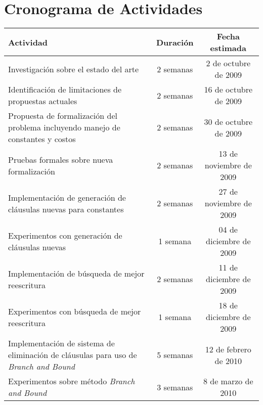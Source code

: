 \section{Cronograma de Actividades}

\begin{tabular}{|p{8cm}|c|c|}
\hline
Actividad & Duración & Fecha estimada \\
\hline
\hline
Investigación sobre el estado del arte & 2 semanas & 2 de octubre de 2009\\
\hline
Identificación de limitaciones de propuestas actuales & 2 semanas & 16 de octubre de 2009\\
\hline
Propuesta de formalización del problema incluyendo manejo de constantes y costos & 2 semanas & 30 de octubre de 2009 \\
\hline
Pruebas formales sobre nueva formalización & 2 semanas &  13 de noviembre de 2009 \\
\hline
Implementación de generación de cláusulas nuevas para constantes & 2 semanas & 27 de noviembre de 2009 \\
\hline
Experimentos con generación de cláusulas nuevas & 1 semana & 04 de diciembre de 2009 \\
\hline
Implementación de búsqueda de mejor reescritura & 2 semanas & 11 de diciembre de 2009 \\
\hline
Experimentos con búsqueda de mejor reescritura & 1 semana & 18 de diciembre de 2009 \\
\hline
Implementación de sistema de eliminación de cláusulas para uso de \emph{Branch and Bound} & 5 semanas & 12 de febrero de 2010 \\
\hline
Experimentos sobre método \emph{Branch and Bound} & 3 semanas & 8 de marzo de 2010 \\
\hline
\end{tabular}
